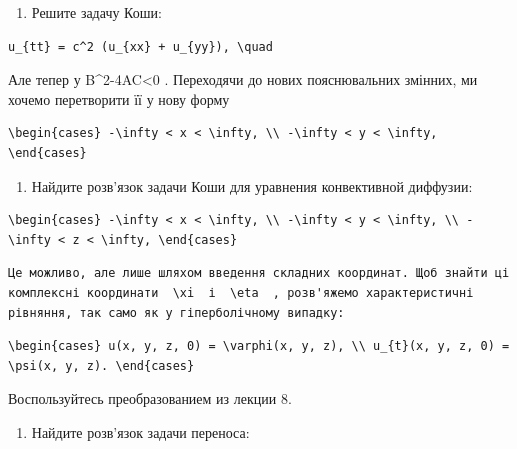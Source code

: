\documentclass[
  ukrainian,
]{article}
\providecommand{\tightlist}{%
  \setlength{\itemsep}{0pt}\setlength{\parskip}{0pt}}
\begin{document}
\begin{enumerate}
\def\labelenumi{\arabic{enumi}.}
\tightlist
\item
  Решите задачу Коши:
\end{enumerate}

\begin{verbatim}
u_{tt} = c^2 (u_{xx} + u_{yy}), \quad
\end{verbatim}

Але тепер у B\^{}2-4AC\textless0 . Переходячи до нових пояснювальних
змінних, ми хочемо перетворити її у нову форму

\begin{verbatim}
\begin{cases} -\infty < x < \infty, \\ -\infty < y < \infty, \end{cases}
\end{verbatim}

\begin{enumerate}
\def\labelenumi{\arabic{enumi}.}
\setcounter{enumi}{1}
\tightlist
\item
  Найдите розв'язок задачи Коши для уравнения конвективной диффузии:
\end{enumerate}

\begin{verbatim}
\begin{cases} -\infty < x < \infty, \\ -\infty < y < \infty, \\ -\infty < z < \infty, \end{cases}
\end{verbatim}

\begin{verbatim}
Це можливо, але лише шляхом введення складних координат. Щоб знайти ці комплексні координати  \xi  і  \eta  , розв'яжемо характеристичні рівняння, так само як у гіперболічному випадку:
\end{verbatim}

\begin{verbatim}
\begin{cases} u(x, y, z, 0) = \varphi(x, y, z), \\ u_{t}(x, y, z, 0) = \psi(x, y, z). \end{cases}
\end{verbatim}

Воспользуйтесь преобразованием из лекции 8.

\begin{enumerate}
\def\labelenumi{\arabic{enumi}.}
\setcounter{enumi}{2}
\tightlist
\item
  Найдите розв'язок задачи переноса:
\end{enumerate}
\end{document}
